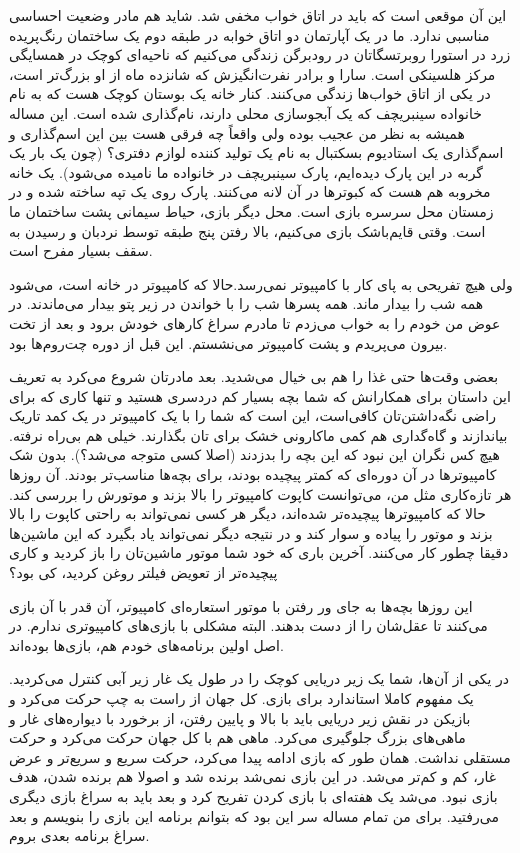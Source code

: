 این آن موقعی است که باید در اتاق خواب مخفی شد. شاید هم مادر وضعیت
احساسی مناسبی ندارد. ما در یک آپارتمان دو اتاق خوابه در طبقه دوم یک
ساختمان رنگ‌پریده زرد در استورا روبرتسگاتان در
رودبرگن زندگی‌ می‌کنیم که ناحیه‌ای کوچک در همسایگی
مرکز هلسینکی است. سارا و برادر نفرت‌انگیزش که شانزده ماه از او بزرگ‌تر
است، در یکی از اتاق خواب‌ها زندگی می‌کنند. کنار خانه یک بوستان کوچک هست
که به نام خانواده سینبریچف که یک
آبجو‌سازی محلی دارند، نام‌گذاری شده است. این مساله همیشه به نظر من عجیب
بوده ولی واقعاً چه فرقی هست بین این اسم‌گذاری و اسم‌گذاری یک استادیوم
بسکتبال به نام یک تولید کننده لوازم دفتری؟ (چون یک بار یک گربه در این
پارک دیده‌ایم، پارک سینبریچف در خانواده ما  نامیده
می‌شود). یک خانه مخروبه هم هست که کبوترها در آن لانه می‌کنند. پارک روی
یک تپه ساخته شده و در زمستان محل سرسره بازی است. محل دیگر بازی، حیاط
سیمانی پشت ساختمان ما است. وقتی قایم‌باشک بازی می‌کنیم، بالا رفتن پنج
طبقه توسط نردبان و رسیدن به سقف بسیار مفرح است.

ولی هیچ تفریحی به پای کار با کامپیوتر نمی‌رسد.حالا که کامپیوتر در خانه
است، می‌شود همه شب را بیدار ماند. همه پسرها شب‌ را با خواندن
 در زیر پتو بیدار می‌ماندند. در عوض من خودم را به خواب
می‌زدم تا مادرم سراغ کارهای خودش برود و بعد از تخت بیرون می‌پریدم و پشت
کامپیوتر می‌نشستم. این قبل از دوره چت‌روم‌ها بود.

 بعضی وقت‌ها حتی غذا را هم بی خیال
می‌شدید. بعد مادرتان شروع می‌کرد به تعریف این داستان برای همکارانش که
شما بچه بسیار کم دردسری هستید و تنها کاری که برای راضی نگه‌داشتن‌تان
کافی‌است، این است که شما را با یک کامپیوتر در یک کمد تاریک بیاندازند و
گاه‌گداری هم کمی ماکارونی خشک برای تان بگذارند. خیلی هم بی‌راه
نرفته. هیچ کس نگران این نبود که این بچه را بدزدند (اصلا کسی متوجه
می‌شد؟). بدون شک کامپیوترها در آن دوره‌ای که کمتر پیچیده بودند، برای
بچه‌ها مناسب‌تر بودند. آن روزها هر تازه‌کاری مثل من، می‌توانست کاپوت
کامپیوتر را بالا بزند و موتورش را بررسی کند. حالا که کامپیوترها
پیچیده‌تر شده‌اند، دیگر هر کسی نمی‌تواند به راحتی کاپوت را بالا بزند و
موتور را پیاده و سوار کند و در نتیجه دیگر نمی‌تواند یاد بگیرد که این
ماشین‌ها دقیقا چطور کار می‌کنند. آخرین باری که خود شما موتور ماشین‌تان را
باز کردید و کاری پیچیده‌تر از تعویض فیلتر روغن کردید، کی بود؟

این روزها بچه‌ها به جای ور رفتن با موتور استعاره‌ای کامپیوتر، آن قدر با
آن بازی می‌کنند تا عقل‌شان را از دست بدهند. البته مشکلی با بازی‌های
کامپیوتری ندارم. در اصل اولین برنامه‌های خودم هم، بازی‌ها بوده‌اند.

در یکی از آن‌ها، شما یک زیر دریایی کوچک را در طول یک غار زیر آبی کنترل
می‌کردید. یک مفهوم کاملا استاندارد برای بازی‌. کل جهان از راست به چپ
حرکت می‌کرد و بازیکن در نقش زیر دریایی باید با بالا و پایین رفتن، از
برخورد با دیواره‌های غار و ماهی‌های بزرگ جلوگیری می‌کرد. ماهی هم با کل
جهان حرکت می‌کرد و حرکت مستقلی نداشت. همان طور که بازی ادامه پیدا
می‌کرد،‌ حرکت سریع و سریع‌تر و عرض غار، کم و کم‌تر می‌شد. در این بازی نمی‌شد
برنده شد و اصولا هم برنده شدن، هدف بازی نبود. می‌شد یک هفته‌ای با بازی
کردن تفریح کرد و بعد باید به سراغ بازی دیگری می‌رفتید. برای من تمام
مساله سر این بود که بتوانم برنامه این بازی را بنویسم و بعد سراغ برنامه
بعدی بروم.

